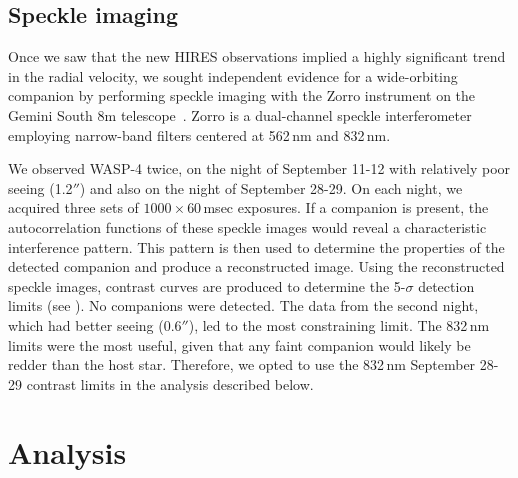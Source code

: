 \documentclass[12pt,twocolumn,tighten]{aastex62}
\begin{document}
\subsection{Speckle imaging}

Once we saw that the new HIRES observations implied a highly
significant trend in the radial velocity, we sought independent
evidence for a wide-orbiting companion by performing speckle imaging
with the Zorro instrument on the Gemini South 8m
telescope~\citep[see][and the instrument
web-pages\footnote{\url{www.gemini.edu/sciops/instruments/alopeke-zorro/}}]{scott_nessi_2018}.
Zorro is a dual-channel speckle interferometer employing narrow-band
filters centered at 562$\,$nm and 832$\,$nm.  

We observed WASP-4 twice, on the night of September 11-12 with
relatively poor seeing (1.2$''$) and also on the night of September
28-29.  On each night, we acquired three sets of $1000\times
60$$\,$msec exposures.  If a companion is present, the autocorrelation
functions of these speckle images would reveal a characteristic
interference pattern. This pattern is then used to determine the
properties of the detected companion and produce a reconstructed
image.  Using the reconstructed speckle images, contrast curves are
produced to determine the 5-$\sigma$ detection limits (see
\citealt{howell_speckle_2011}).  No companions were detected. The data
from the second night, which had better seeing (0.6$''$), led to the
most constraining limit.  The 832$\,$nm limits were the most useful,
given that any faint companion would likely be redder than the host
star.  Therefore, we opted to use the 832$\,$nm September 28-29
contrast limits in the analysis described below.


\section{Analysis}
\label{sec:analysis}
\end{document}
